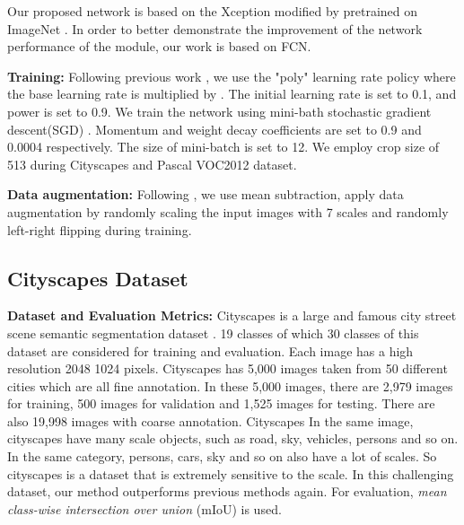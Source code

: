 \documentclass[final]{cvpr}
\begin{document}
Our proposed network is based on the Xception modified by \cite{Deeplabv3+} pretrained on ImageNet \cite{ImageNet}. In order to better demonstrate the improvement of the network performance of the module, our work is based on FCN.

\textbf{Training:} Following previous work \cite{Deeplabv2}, we use the "poly" learning rate policy where the base learning rate is multiplied by . The initial learning rate is set to 0.1, and power is set to 0.9. We train the network using mini-bath stochastic gradient descent(SGD) \cite{ImageNet}. Momentum and weight decay coefficients are set to 0.9 and 0.0004 respectively. The size of mini-batch is set to 12. We employ crop size of 513 during Cityscapes and Pascal VOC2012 dataset.

\textbf{Data augmentation:} Following \cite{Deeplabv3}, we use mean subtraction, apply data augmentation by randomly scaling the input images with 7 scales  and randomly left-right flipping during training.


\subsection{Cityscapes Dataset}

\textbf{Dataset and Evaluation Metrics: } Cityscapes is a large and famous city street scene semantic segmentation dataset \cite{cityscpaes}. 19 classes of which 30 classes of this dataset are considered for training and evaluation. Each image has a high resolution 2048  1024 pixels. Cityscapes has 5,000 images taken from 50 different cities which are all fine annotation. In these 5,000 images, there are 2,979 images for training, 500 images for validation and 1,525 images for testing. There are also 19,998 images with coarse annotation. Cityscapes In the same image, cityscapes have many scale objects, such as road, sky, vehicles, persons and so on. In the same category, persons, cars, sky and so on also have a lot of scales. So cityscapes is a dataset that is extremely sensitive to the scale. In this challenging dataset, our method outperforms previous methods again. For evaluation, \emph{mean class-wise intersection over union} (mIoU) is used.
\end{document}
